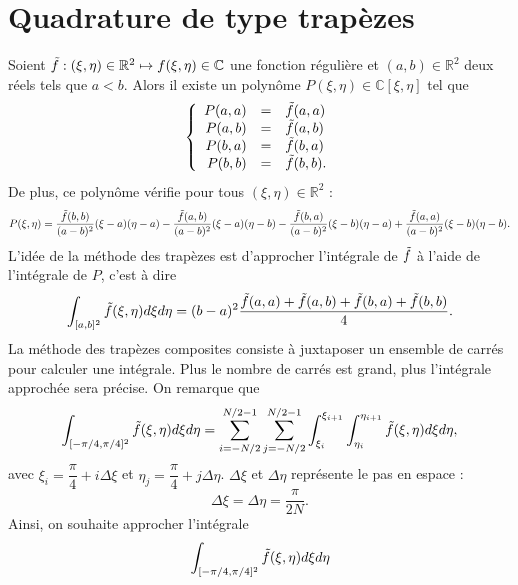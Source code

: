 \section{Quadrature de type trapèzes}

Soient $\tilde{f} : (\xi, \eta) \in \mathbb{R}^2 \mapsto f(\xi, \eta) \in \mathbb{C}$ une fonction régulière et $(a,b) \in \mathbb{R}^2$ deux réels tels que $a<b$. Alors il existe un polynôme $P(\xi, \eta) \in \mathbb{C}[\xi, \eta]$ tel que 
\begin{equation}
\left\lbrace
\begin{array}{rcl}
P(a,a) & = & \tilde{f}(a,a) \\
P(a,b) & = & \tilde{f}(a,b) \\
P(b,a) & = & \tilde{f}(b,a) \\
P(b,b) & = & \tilde{f}(b,b).
\end{array}
\right.
\end{equation}
De plus, ce polynôme vérifie pour tous $(\xi, \eta) \in \mathbb{R}^2$ :
\begin{equation}
P(\xi, \eta) = \dfrac{\tilde{f}(b,b)}{(a-b)^2}(\xi-a)(\eta-a) - \dfrac{\tilde{f}(a,b)}{(a-b)^2}(\xi-a)(\eta-b) -\dfrac{\tilde{f}(b,a)}{(a-b)^2}(\xi-b)(\eta-a)+ \dfrac{\tilde{f}(a,a)}{(a-b)^2}(\xi-b)(\eta-b).
\end{equation}
L'idée de la méthode des trapèzes est d'approcher l'intégrale de $\tilde{f}$ à l'aide de l'intégrale de $P$, c'est à dire
\begin{equation}
\displaystyle\int_{[a,b]^2} \tilde{f}(\xi, \eta) d\xi d\eta = (b-a)^2 \dfrac{\tilde{f}(a,a) + \tilde{f}(a,b) + \tilde{f}(b,a) + \tilde{f}(b,b)}{4}.
\label{eq:tpzapprox}
\end{equation}
La méthode des trapèzes composites consiste à juxtaposer un ensemble de carrés pour calculer une intégrale. Plus le nombre de carrés est grand, plus l'intégrale approchée sera précise. On remarque que
\begin{equation}
\displaystyle\int_{[-\pi/4,\pi/4]^2} \tilde{f}(\xi, \eta) d\xi d\eta = \displaystyle\sum\limits_{i=-N/2}^{N/2-1} \displaystyle\sum\limits_{j=-N/2}^{N/2-1} \displaystyle\int_{\xi_i}^{\xi_{i+1}} \displaystyle\int_{\eta_i}^{\eta_{i+1}} \tilde{f}(\xi, \eta) d\xi d\eta,
\end{equation}
avec $\xi_i = \dfrac{\pi}{4} + i \Delta \xi$ et $\eta_j = \dfrac{\pi}{4} + j \Delta \eta$. $\Delta \xi$ et $\Delta \eta$ représente le pas en espace :
\begin{equation}
\Delta \xi = \Delta \eta = \dfrac{\pi}{2N}.
\end{equation}
Ainsi, on souhaite approcher l'intégrale
\begin{equation}
\displaystyle\int_{[-\pi/4,\pi/4]^2} \tilde{f}(\xi, \eta) d\xi d\eta
\end{equation}
